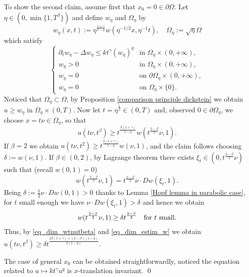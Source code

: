 \documentclass[10pt,a4paper]{amsart}
\newcommand{\Omegabar}{\overline{\Omega}}
\renewenvironment{proof}[1][\proofname]{\medskip \noindent {\bfseries #1. }}{\qed \bigskip}
\begin{document}
\begin{proof}
To show the second claim, assume first that $x_0 = 0 \in \partial \Omega$.
Let $\eta \in (0,\min\{1,T^{\beta}\})$ and define $w_\eta$ and $\Omega_\eta$ by 
	\[ w_\eta(x,t) :=\eta^{\frac{1 +\gamma}{1-q}}w(\eta^{-1/2}x,\eta^{-1}t), \quad \Omega_\eta:= \sqrt{\eta} \Omega \]
	which satisfy		
	\begin{equation*}
		\begin{cases}
			\partial_t w_\eta-\Delta w_\eta \leq 
			k t^{\gamma}(w_\eta)^q &\text{in }\Omega_\eta\times (0,+\infty),\\
			w_\eta>0 & \text{in } \Omega_\eta\times (0,+\infty), \\
			w_\eta=0 & \text{on }\partial \Omega_\eta\times (0,+\infty),\\ 
			w_\eta=0& \text{on } \Omega_\eta \times \{0\}.	
			\end{cases}
	\end{equation*}
Noticed that $\Omega_{\eta} \subset \Omega$, by Proposition \ref{comparison principle dickstein} we obtain $u\geq w_\eta$ in $\Omegabar_\eta\times (0,T)$. 
Now let $t=\eta^{\frac{1}{\beta}} \in (0, T)$ and, observed $0 \in \partial \Omega_{\eta}$, we choose $x=t\nu \in \Omega_{\eta}$, so that
\begin{equation}\label{eq_dim_wtnutbeta}
 u(t\nu,t^{\beta})\geq t^{\frac{\beta (1+\gamma)
	}{1-q}}w(t^{\frac{2-\beta}{2}}\nu,1). 
	\end{equation}
	If $\beta=2$ we obtain $u(t\nu,t^{2})\geq t^{\frac{2 (1+\gamma)
	}{1-q}}w(\nu,1)$, and the claim follows choosing $\delta :=w(\nu,1)$. If $\beta \in (0,2)$, 
by Lagrange theorem there exists $\xi_{t}\in (0,t^{\frac{2-\beta}{2}}\nu)$ such that (recall $w(0,1)=0$)
	$$w(t^{\frac{2-\beta}{2}}\nu,1) = t^{\frac{2-\beta}{2}}\nu\cdot D w(\xi_t,1).
	$$
	Being $\delta:= \frac{1}{2}\nu\cdot D w(0,1)>0$ thanks to  Lemma \ref{Hopf lemma in parabolic case}, for $t$ small enough we have $\nu\cdot D w(\xi_t,1)>\delta$ and hence we obtain
	\begin{equation}\label{eq_dim_estim_w}
	 w(t^{\frac{2-\beta}{2}}\nu,1) \geq \delta t^{\frac{2-\beta}{2}}\quad \hbox{for $t$ small}.
	 \end{equation}
	Thus, by \eqref{eq_dim_wtnutbeta} and \eqref{eq_dim_estim_w} we obtain $u(t\nu,t^{\beta})\geq \delta t^{\frac{2\beta(1+\gamma)+(2-\beta)(1-q) }{2(1-q)}}$.

The case of general $x_0$ can be obtained straightforwardly, noticed the equation related to $u \mapsto k t^{\gamma} u^q$ is $x$-translation invariant.
\end{proof}
\end{document}
